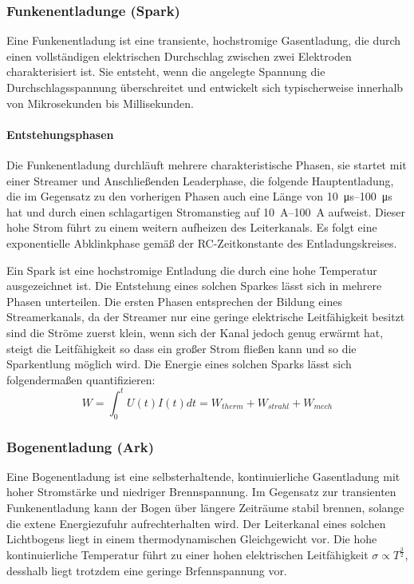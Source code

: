 \subsubsection{Funkenentladunge (Spark)}
Eine Funkenentladung ist eine transiente, hochstromige Gasentladung, die durch einen vollständigen elektrischen Durchschlag zwischen zwei Elektroden charakterisiert ist. Sie entsteht, wenn die angelegte Spannung die Durchschlagsspannung überschreitet und entwickelt sich typischerweise innerhalb von Mikrosekunden bis Millisekunden. 

\paragraph{Entstehungsphasen}\newline
Die Funkenentladung durchläuft mehrere charakteristische Phasen, sie startet mit einer Streamer und Anschließenden Leaderphase, die folgende Hauptentladung, die im Gegensatz zu den vorherigen Phasen auch eine Länge von \SIrange{10}{100}{\micro\second} hat und durch einen schlagartigen Stromanstieg auf \SIrange{10}{100}{\ampere} aufweist. Dieser hohe Strom führt zu einem weitern aufheizen des Leiterkanals. Es folgt eine exponentielle Abklinkphase gemäß der RC-Zeitkonstante des Entladungskreises.


Ein Spark ist eine hochstromige Entladung die durch eine hohe Temperatur ausgezeichnet ist. Die Entstehung eines solchen Sparkes lässt sich in mehrere Phasen unterteilen. Die ersten Phasen entsprechen der Bildung eines Streamerkanals, da der Streamer nur eine geringe elektrische Leitfähigkeit besitzt sind die Ströme zuerst klein, wenn sich der Kanal jedoch genug erwärmt hat, steigt die Leitfähigkeit so dass ein großer Strom fließen kann und so die Sparkentlung möglich wird.
Die Energie eines solchen Sparks lässt sich folgendermaßen quantifizieren:
\begin{equation}
    W = \int_{0}^{t} U(t)I(t)dt = W_{therm} + W_{strahl} + W_{mech}
\end{equation}
\subsubsection{Bogenentladung (Ark)}
Eine Bogenentladung ist eine selbsterhaltende, kontinuierliche Gasentladung mit hoher Stromstärke und niedriger Brennspannung. Im Gegensatz zur transienten Funkenentladung kann der Bogen über längere Zeiträume stabil brennen, solange die extene Energiezufuhr aufrechterhalten wird. Der Leiterkanal eines solchen Lichtbogens liegt in einem thermodynamischen Gleichgewicht vor. Die hohe kontinuierliche Temperatur führt zu einer hohen elektrischen Leitfähigkeit \(\sigma \propto T^{\frac{3}{2}}\), desshalb liegt trotzdem eine geringe Brfennspannung vor. 


